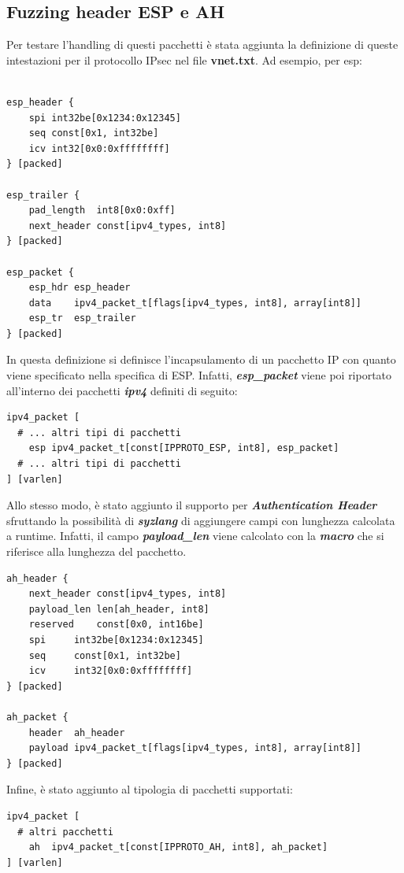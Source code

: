 \documentclass{article}
\begin{document}
\subsection{Fuzzing header ESP e AH} 
Per testare l'handling di questi pacchetti è stata aggiunta la definizione di queste 
intestazioni per il protocollo IPsec nel file \textbf{vnet.txt}. Ad esempio, per 
esp:
\begin{verbatim}

esp_header {
	spi	int32be[0x1234:0x12345]
	seq	const[0x1, int32be]
	icv	int32[0x0:0xffffffff]
} [packed]

esp_trailer {
	pad_length	int8[0x0:0xff]
	next_header	const[ipv4_types, int8]
} [packed]

esp_packet {
	esp_hdr	esp_header
	data	ipv4_packet_t[flags[ipv4_types, int8], array[int8]]
	esp_tr	esp_trailer
} [packed]
\end{verbatim}
In questa definizione si definisce l'incapsulamento di un pacchetto IP con quanto 
viene specificato nella specifica di ESP. Infatti, \textbf{\textit{esp\_packet}} viene 
poi riportato all'interno dei pacchetti \textbf{\textit{ipv4}} definiti di seguito:

\begin{verbatim}
ipv4_packet [
  # ... altri tipi di pacchetti
	esp	ipv4_packet_t[const[IPPROTO_ESP, int8], esp_packet]
  # ... altri tipi di pacchetti
] [varlen] 
\end{verbatim}

Allo stesso modo, è stato aggiunto il supporto per \textbf{\textit{Authentication Header}}
sfruttando la possibilità di \textbf{\textit{syzlang}} di aggiungere campi con lunghezza
calcolata a runtime. Infatti, il campo \textbf{\textit{payload\_len}} viene calcolato con
la \textbf{\textit{macro}} che si riferisce alla lunghezza del pacchetto.

\begin{verbatim}
ah_header {
	next_header	const[ipv4_types, int8]
	payload_len	len[ah_header, int8]
	reserved	const[0x0, int16be]
	spi		int32be[0x1234:0x12345]
	seq		const[0x1, int32be]
	icv		int32[0x0:0xffffffff]
} [packed]

ah_packet {
	header	ah_header
	payload	ipv4_packet_t[flags[ipv4_types, int8], array[int8]]
} [packed]
\end{verbatim}

Infine, è stato aggiunto al tipologia di pacchetti supportati:
\begin{verbatim}
ipv4_packet [
  # altri pacchetti
	ah	ipv4_packet_t[const[IPPROTO_AH, int8], ah_packet]
] [varlen]
\end{verbatim}
\end{document}
